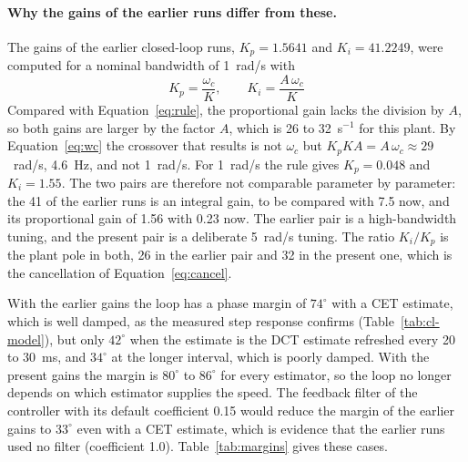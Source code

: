 \paragraph{Why the gains of the earlier runs differ from these.}
The gains of the earlier closed-loop runs, $K_p = 1.5641$ and $K_i = 41.2249$, were computed for a nominal bandwidth of 1~rad/s with
\begin{equation}
    K_p = \frac{\omega_c}{K}, \qquad K_i = \frac{A\,\omega_c}{K}
    \label{eq:earlier-rule}
\end{equation}
Compared with Equation~\ref{eq:rule}, the proportional gain lacks the division by $A$, so both gains are larger by the factor $A$, which is 26 to 32~s$^{-1}$ for this plant. By Equation~\ref{eq:wc} the crossover that results is not $\omega_c$ but $K_p K A = A\,\omega_c \approx 29$~rad/s, 4.6~Hz, and not 1~rad/s. For 1~rad/s the rule gives $K_p = 0.048$ and $K_i = 1.55$. The two pairs are therefore not comparable parameter by parameter: the 41 of the earlier runs is an integral gain, to be compared with 7.5 now, and its proportional gain of 1.56 with 0.23 now. The earlier pair is a high-bandwidth tuning, and the present pair is a deliberate 5~rad/s tuning. The ratio $K_i/K_p$ is the plant pole in both, 26 in the earlier pair and 32 in the present one, which is the cancellation of Equation~\ref{eq:cancel}.

With the earlier gains the loop has a phase margin of $74^{\circ}$ with a CET estimate, which is well damped, as the measured step response confirms (Table~\ref{tab:cl-model}), but only $42^{\circ}$ when the estimate is the DCT estimate refreshed every 20 to 30~ms, and $34^{\circ}$ at the longer interval, which is poorly damped. With the present gains the margin is $80^{\circ}$ to $86^{\circ}$ for every estimator, so the loop no longer depends on which estimator supplies the speed. The feedback filter of the controller with its default coefficient 0.15 would reduce the margin of the earlier gains to $33^{\circ}$ even with a CET estimate, which is evidence that the earlier runs used no filter (coefficient 1.0). Table~\ref{tab:margins} gives these cases.

